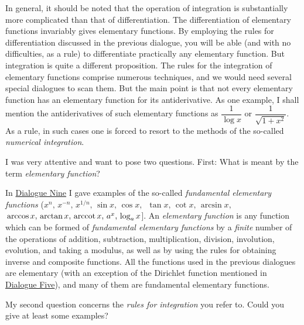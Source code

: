 In general, it should be noted that the operation of integration is substantially more complicated than that of differentiation. The differentiation of elementary functions invariably gives elementary functions. By employing the rules for differentiation discussed in the previous dialogue, you will be able (and with no difficulties, as a rule) to differentiate practically any elementary function. But integration is quite a different proposition. The rules for the integration of elementary functions comprise numerous techniques, and we would need several special dialogues to scan them. But the main point is that not every elementary function has an elementary function for its antiderivative. As one example, I shall mention the antiderivatives of such elementary
functions as $\dfrac{1}{\log x}$ or $\dfrac{1}{ \sqrt{1 + x^{2}}} $.
 As a rule, in such cases one is forced to resort to the methods of the so-called \emph{numerical integration}.

\rdr I was very attentive and want to pose two questions. First: What is meant by the term \emph{elementary function}?

\athr In \hyperref[derivative]{Dialogue Nine} I gave examples of the so-called \emph{fundamental elementary functions} ($x^{n}, \, x^{-n}, \, x^{1/n}, \, \sin x, \, \cos x,$ $\,	\tan x, \,	\cot x,	\, \arcsin x,$ $\,	\arccos x,	\, \arctan x, \,	\operatorname{arccot} x, \, a^{x}, \, \log_{a} x$]. An \emph{elementary function} is any function which can be formed of \emph{fundamental elementary functions} by a \emph{finite} number of the operations of addition, subtraction, multiplication, division, involution, evolution, and taking a modulus, as well as by using the rules for obtaining inverse and composite functions. All the functions used in the previous dialogues are elementary (with an exception of the Dirichlet function mentioned in \hyperref[{more-on-function}]{Dialogue Five}), and many of them are fundamental elementary functions.

\rdr My second question concerns the \emph{rules for integration} you refer to. Could you give at least some examples?

